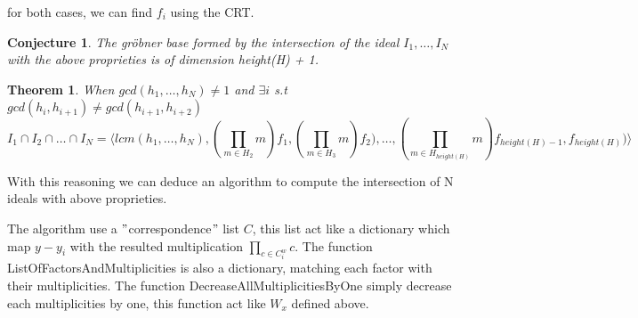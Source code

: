 \documentclass{article}
\newtheorem{theorem}{Theorem}[section]
\newtheorem{conjecture}{Conjecture}[section]
\begin{document}
for both cases, we can find $f_{i}$ using the CRT\@.

\begin{conjecture}
    The gröbner base formed by the intersection of the ideal $I_{1},\dots,I_{N}$ with the above proprieties is of dimension height(H) + 1.
\end{conjecture}


\begin{theorem}
     When $gcd(h_{1},\dots,h_{N}) \neq 1$ and $\exists i$ s.t $gcd(h_{i},h_{i+1}) \neq gcd(h_{i+1},h_{i+2})$
    \begin{displaymath}
        I_{1} \cap I_{2} \cap \dots \cap I_{N} = \langle lcm(h_{1},\dots,h_{N}),(\prod_{m \in H_{2}} m)f_{1},(\prod_{m \in H_{3}} m)f_{2}),\dots,(\prod_{m \in H_{height(H)}} m)f_{height(H)-1},f_{height(H)})\rangle
    \end{displaymath}
\end{theorem}

With this reasoning we can deduce an algorithm to compute the intersection of N ideals with above proprieties.

The algorithm use a \("\)correspondence\("\) list $C$, this list act like a dictionary which map $y-y_{i}$ with the resulted multiplication $\prod_{c \in C_{i}^{w} } c$.\newline
The function ListOfFactorsAndMultiplicities is also a dictionary, matching each factor with their multiplicities.\newline
The function DecreaseAllMultiplicitiesByOne simply decrease each multiplicities by one, this function act like $W_{x}$ defined above.\newline
\end{document}
